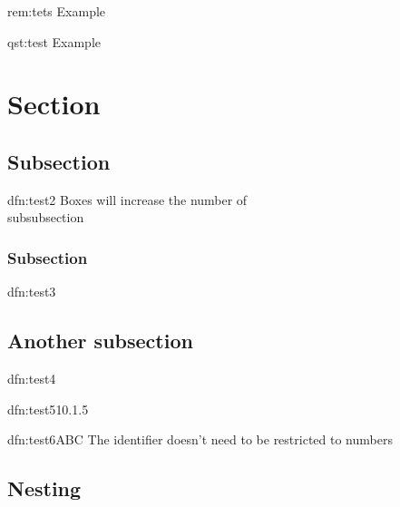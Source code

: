 \documentclass[]{article}
\begin{document}
\begin{rem}[Example]{rem:tets}{}
    Example
\end{rem}

\begin{qst}[Example]{qst:test}{}
    Example
\end{qst}

\newpage

\section{Section}
\subsection{Subsection}
\begin{dfn}{dfn:test2}{}
    Boxes will increase the number of \\subsubsection
\end{dfn}

\subsubsection{Subsection}

\begin{dfn}{dfn:test3}{}

\end{dfn}

\subsection{Another subsection}

\begin{dfn}{dfn:test4}{}

\end{dfn}

\begin{dfn}{dfn:test5}{10.1.5}

\end{dfn}

\begin{dfn}{dfn:test6}{ABC}
    The identifier doesn't need to be restricted to numbers
\end{dfn}

\newpage
\subsection{Nesting}
\end{document}
